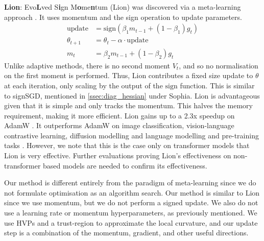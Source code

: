 \textbf{Lion}: Evo\textbf{L}ved S\textbf{i}gn M\textbf{o}me\textbf{n}tum (Lion) was discovered via a meta-learning approach \citep{chen2024symbolic}. It uses momentum and the sign operation to update parameters.
\begin{align}
    \text{update} &= \text{sign}(\beta_1 m_{t-1} + (1 - \beta_1)g_t) \\ 
    \theta_{t+1} &= \theta_t - \alpha \cdot \text{update} \\ 
    m_t &= \beta_2 m_{t-1} + (1 - \beta_2)g_t
\end{align}
Unlike adaptive methods, there is no second moment $V_t$, and so no normalisation on the first moment is performed. Thus, Lion contributes a fixed size update to $\theta$ at each iteration, only scaling by the output of the $\text{sign}$ function. This is similar to signSGD, mentioned in \cref{ssec:diag_hessian} under Sophia. Lion is advantageous given that it is simple and only tracks the momentum. This halves the memory requirement, making it more efficient. Lion gains up to a 2.3x speedup on AdamW \citep{chen2024symbolic}. It outperforms AdamW on image classification, vision-language contrastive learning, diffusion modelling and language modelling and pre-training tasks \citep{chen2024symbolic}. However, we note that this is the case only on transformer models that Lion is very effective. Further evaluations proving Lion's effectiveness on non-transformer based models are needed to confirm its effectiveness.

Our method is different entirely from the paradigm of meta-learning since we do not formulate optimisation as an algorithm search. Our method is similar to Lion since we use momentum, but we do not perform a signed update. We also do not use a learning rate or momentum hyperparameters, as previously mentioned. We use HVPs and a trust-region to approximate the local curvature, and our update step is a combination of the momentum, gradient, and other useful directions. 